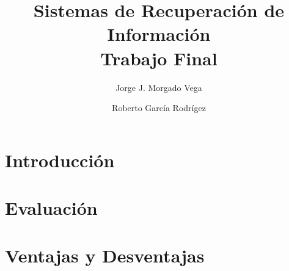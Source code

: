 \documentclass{llncs}
\begin{document}
\frontmatter
\pagestyle{headings}  %

\mainmatter              %
%
\title{Sistemas de Recuperación de Información\\ Trabajo Final}
%
%
\author{Jorge J. Morgado Vega \and Roberto García Rodrígez}
%
%
%

\maketitle              %

\renewcommand\abstractname{Resúmen.}
\renewcommand\keywordname{{\bf Palabras Claves:}}
\begin{abstract}
	
\keywords{}
\end{abstract}
\renewcommand\abstractname{Abstract.}
\renewcommand\keywordname{{\bf Keywords:}}
\begin{abstract}
	
\keywords{}
\end{abstract}
%

\tableofcontents
\clearpage

\section{Introducción}\label{sec:intro}




\section{Evaluación}\label{sec:eval}


\section{Ventajas y Desventajas}\label{sec:pros_cons}

\end{document}
